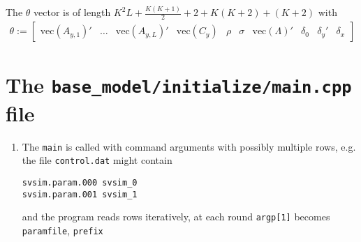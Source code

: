 \documentclass[11pt, letterpaper, notitlepage]{article}
\begin{document}
The $\theta$ vector is of length $K^2L + \frac{K(K+1)}{2} + 2 + K(K+2) + (K+2)$ with 
\begin{align*}
\theta :=\begin{bmatrix}
 \text{vec}\left(A_{y, 1}\right)' & \dots & \text{vec}\left(A_{y, L}\right)' & \text{vec}\left(C_y\right) & \rho & \sigma & \text{vec}\left(\Lambda\right)' &  \delta_0 & \delta_y' & \delta_x
\end{bmatrix}
\end{align*}


\pagebreak

\section*{The \texttt{base\_model/initialize/main.cpp} file }

\begin{enumerate}
\item The \texttt{main} is called with command arguments with possibly multiple rows, e.g. the file \texttt{control.dat} might contain 
\begin{verbatim}
svsim.param.000 svsim_0
svsim.param.001 svsim_1 
\end{verbatim} 
and the program reads rows iteratively, at each round \texttt{argp[1]} becomes \texttt{paramfile}, \texttt{prefix}


\end{enumerate}
\end{document}
